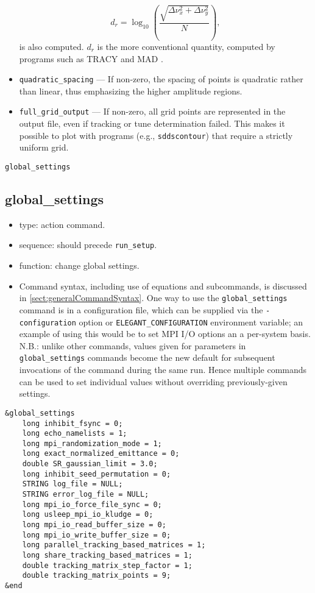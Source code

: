 \documentclass[11pt]{article}
\begin{document}
\begin{itemize}
\begin{equation}
  d_r = \log_{10} \left(\frac{\sqrt{\Delta\nu_x^2 + \Delta\nu_y^2}}{N}\right),
\end{equation} is also computed. $d_r$ is the more conventional quantity, computed by
programs such as TRACY and MAD \cite{BuesingPC}.
\item \verb|quadratic_spacing| --- If non-zero, the spacing of points is quadratic rather than linear, thus emphasizing
  the higher amplitude regions.
\item \verb|full_grid_output| --- If non-zero, all grid points are represented in the output file, even if tracking or
  tune determination failed. This makes it possible to plot with programs (e.g., \verb|sddscontour|) that require
  a strictly uniform grid.
\end{itemize}

\newpage
\begin{center}{\Large\verb|global_settings|}\end{center}
\subsection{global\_settings \label{subsec:globalsettings}}

\begin{itemize}
\item type: action command.  
\item sequence: should precede \verb|run_setup|.
\item function: change global settings.
\item Command syntax, including use of equations and subcommands, is discussed in \ref{sect:generalCommandSyntax}.
 One way to use the \verb|global_settings| command is in a configuration file, which can be supplied via the 
 \verb|-configuration| option or \verb|ELEGANT_CONFIGURATION| environment variable; an example of using this
 would be to set MPI I/O options an a per-system basis.
 N.B.: unlike other commands, values given for parameters in \verb|global_settings| commands become the
 new default for subsequent invocations of the command during the same run. Hence multiple commands can be used
 to set individual values without overriding previously-given settings.
\end{itemize}

\begin{verbatim}
&global_settings
    long inhibit_fsync = 0;
    long echo_namelists = 1;
    long mpi_randomization_mode = 1;
    long exact_normalized_emittance = 0;
    double SR_gaussian_limit = 3.0;
    long inhibit_seed_permutation = 0;
    STRING log_file = NULL;
    STRING error_log_file = NULL;
    long mpi_io_force_file_sync = 0;
    long usleep_mpi_io_kludge = 0;
    long mpi_io_read_buffer_size = 0;
    long mpi_io_write_buffer_size = 0;
    long parallel_tracking_based_matrices = 1;
    long share_tracking_based_matrices = 1;
    double tracking_matrix_step_factor = 1;
    double tracking_matrix_points = 9;
&end
\end{verbatim}
\end{document}
